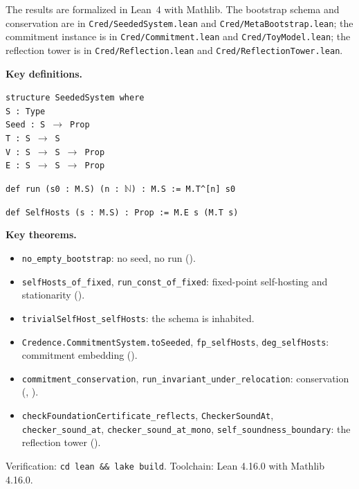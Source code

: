 \documentclass[11pt,a4paper]{article}
\newcommand{\Nat}{\mathbb{N}}
\begin{document}
The results are formalized in Lean~4 with Mathlib.
The bootstrap schema and conservation are in \texttt{Cred/SeededSystem.lean} and
\texttt{Cred/MetaBootstrap.lean}; the commitment instance is in
\texttt{Cred/Commitment.lean} and \texttt{Cred/ToyModel.lean}; the reflection
tower is in \texttt{Cred/Reflection.lean} and \texttt{Cred/ReflectionTower.lean}.

\textbf{Key definitions.}

\medskip
\noindent
\texttt{structure SeededSystem where}\\
\null\quad \texttt{S : Type}\\
\null\quad \texttt{Seed : S}~$\to$~\texttt{Prop}\\
\null\quad \texttt{T : S}~$\to$~\texttt{S}\\
\null\quad \texttt{V : S}~$\to$~\texttt{S}~$\to$~\texttt{Prop}\\
\null\quad \texttt{E : S}~$\to$~\texttt{S}~$\to$~\texttt{Prop}

\medskip
\noindent
\texttt{def run (s0 : M.S) (n :}~$\Nat$\texttt{) : M.S := M.T\^{}[n] s0}

\medskip
\noindent
\texttt{def SelfHosts (s : M.S) : Prop := M.E s (M.T s)}

\medskip
\textbf{Key theorems.}
\begin{itemize}[nosep]
\item \texttt{no\_empty\_bootstrap}: no seed, no run
  ().
\item \texttt{selfHosts\_of\_fixed}, \texttt{run\_const\_of\_fixed}:
  fixed-point self-hosting and stationarity
  ().
\item \texttt{trivialSelfHost\_selfHosts}: the schema is inhabited.
\item \texttt{Credence.CommitmentSystem.toSeeded}, \texttt{fp\_selfHosts},
  \texttt{deg\_selfHosts}: commitment embedding
  ().
\item \texttt{commitment\_conservation},
  \texttt{run\_invariant\_under\_relocation}: conservation
  (, ).
\item \texttt{checkFoundationCertificate\_reflects},
  \texttt{CheckerSoundAt}, \texttt{checker\_sound\_at},
  \texttt{checker\_sound\_at\_mono},
  \texttt{self\_soundness\_boundary}: the reflection tower
  ().
\end{itemize}

Verification: \texttt{cd lean \&\& lake build}.
Toolchain: Lean 4.16.0 with Mathlib 4.16.0.
\end{document}
